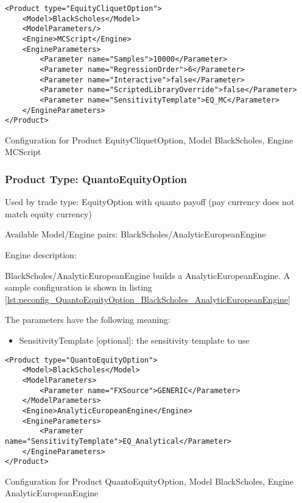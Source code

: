 \begin{longlisting}
\begin{verbatim}
<Product type="EquityCliquetOption">
    <Model>BlackScholes</Model>
    <ModelParameters/>
    <Engine>MCScript</Engine>
    <EngineParameters>
        <Parameter name="Samples">10000</Parameter>
        <Parameter name="RegressionOrder">6</Parameter>
        <Parameter name="Interactive">false</Parameter>
        <Parameter name="ScriptedLibraryOverride">false</Parameter>
        <Parameter name="SensitivityTemplate">EQ_MC</Parameter>
    </EngineParameters>
</Product>
\end{verbatim}
\caption{Configuration for Product EquityCliquetOption, Model BlackScholes, Engine MCScript}
\label{lst:peconfig_EquityCliquetOption_BlackScholes_MCScript}
\end{longlisting}

\subsubsection{Product Type: QuantoEquityOption}

Used by trade type: EquityOption with quanto payoff (pay currency does not match equity currency)

Available Model/Engine pairs: BlackScholes/AnalyticEuropeanEngine

Engine description:

BlackScholes/AnalyticEuropeanEngine builds a AnalyticEuropeanEngine. A sample configuration is shown in listing
\ref{lst:peconfig_QuantoEquityOption_BlackScholes_AnalyticEuropeanEngine}

The parameters have the following meaning:

\begin{itemize}
\item SensitivityTemplate [optional]: the sensitivity template to use 
\end{itemize}

\begin{longlisting}
\begin{verbatim}
<Product type="QuantoEquityOption">
    <Model>BlackScholes</Model>
    <ModelParameters>
        <Parameter name="FXSource">GENERIC</Parameter>
    </ModelParameters>
    <Engine>AnalyticEuropeanEngine</Engine>
    <EngineParameters>
        <Parameter name="SensitivityTemplate">EQ_Analytical</Parameter>
    </EngineParameters>
</Product>
\end{verbatim}
\caption{Configuration for Product QuantoEquityOption, Model BlackScholes, Engine AnalyticEuropeanEngine}
\label{lst:peconfig_QuantoEquityOption_BlackScholes_AnalyticEuropeanEngine}
\end{longlisting}

